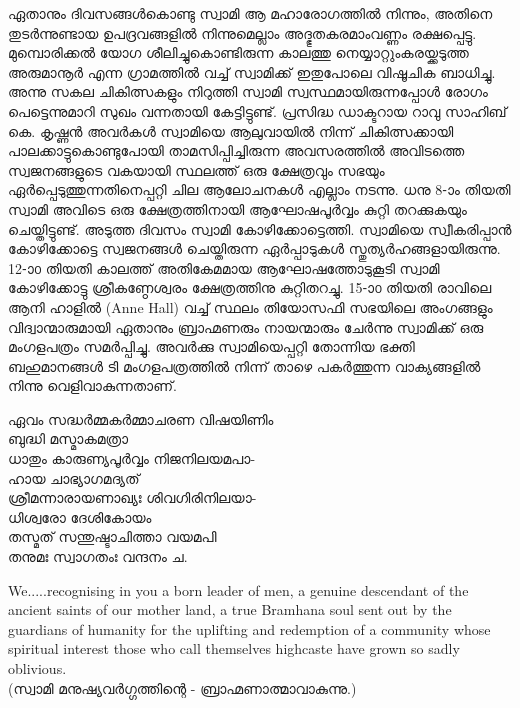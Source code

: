 \documentclass[12pt,openany]{book}
\newenvironment{myverse}
{\begin{quoting}[leftmargin=3em, rightmargin=3em, vskip=2ex, indentfirst=false, font=small]}
	{\end{quoting}}
\begin{document}
	ഏതാനും ദിവസങ്ങൾകൊണ്ടു സ്വാമി ആ മഹാരോഗത്തിൽ നിന്നും, അതിനെ തുടർന്നുണ്ടായ ഉപദ്രവങ്ങളിൽ നിന്നുമെല്ലാം അദ്ഭുതകരമാംവണ്ണം രക്ഷപ്പെട്ടു. മുമ്പൊരിക്കൽ യോഗ ശീലിച്ചുകൊണ്ടിരുന്ന കാലത്തു നെയ്യാറ്റുംകരയ്ക്കടുത്ത അരുമാനൂർ എന്ന ഗ്രാമത്തിൽ വച്ച് സ്വാമിക്ക് ഇതുപോലെ വിഷൂചിക ബാധിച്ചു. അന്നു സകല ചികിത്സകളും നിറുത്തി സ്വാമി സ്വസ്ഥമായിരുന്നപ്പോൾ രോഗം പെട്ടെന്നുമാറി സുഖം വന്നതായി കേട്ടിട്ടുണ്ട്. പ്രസിദ്ധ ഡാക്ടറായ റാവു സാഹിബ് കെ. കൃഷ്ണൻ അവർകൾ സ്വാമിയെ ആലുവായിൽ നിന്ന് ചികിത്സക്കായി പാലക്കാട്ടുകൊണ്ടുപോയി താമസിപ്പിച്ചിരുന്ന അവസരത്തിൽ അവിടത്തെ സ്വജനങ്ങളുടെ വകയായി സ്ഥലത്ത് ഒരു ക്ഷേത്രവും സഭയും ഏർപ്പെടുത്തുന്നതിനെപ്പറ്റി ചില ആലോചനകൾ എല്ലാം നടന്നു. ധനു 8-ാം തിയതി സ്വാമി അവിടെ ഒരു ക്ഷേത്രത്തിനായി ആഘോഷപൂർവ്വം കുറ്റി തറക്കുകയും ചെയ്തിട്ടുണ്ട്. അടുത്ത ദിവസം സ്വാമി കോഴിക്കോട്ടെത്തി. സ്വാമിയെ സ്വീകരിപ്പാൻ കോഴിക്കോട്ടെ സ്വജനങ്ങൾ ചെയ്തിരുന്ന ഏർപ്പാടുകൾ സ്തുത്യർഹങ്ങളായിരുന്നു. 12-ാ൦ തിയതി കാലത്ത് അതികേമമായ ആഘോഷത്തോടുകൂടി സ്വാമി കോഴിക്കോട്ടു ശ്രീകണ്ഠേശ്വരം ക്ഷേത്രത്തിനു കുറ്റിതറച്ചു. 15-ാ൦ തിയതി രാവിലെ ആനി ഹാളിൽ (Anne Hall) വച്ച് സ്ഥലം തിയോസഫി സഭയിലെ അംഗങ്ങളും വിദ്വാന്മാരുമായി ഏതാനും ബ്രാഹ്മണരും നായന്മാരും ചേർന്നു സ്വാമിക്ക് ഒരു മംഗളപത്രം സമർപ്പിച്ചു. അവർക്കു സ്വാമിയെപ്പറ്റി തോന്നിയ ഭക്തി ബഹുമാനങ്ങൾ ടി മംഗളപത്രത്തിൽ നിന്ന് താഴെ പകർത്തുന്ന വാക്യങ്ങളിൽ നിന്നു വെളിവാകുന്നതാണ്.
	
	\begin{myverse}
		ഏവം സദ്ധർമ്മകർമ്മാചരണ വിഷയിണിം\\
		\hspace*{2cm}ബുദ്ധി മസ്മാകമത്രാ\\
		ധാതും കാരുണ്യപൂർവ്വം നിജനിലയമപാ-\\
		\hspace*{2cm}ഹായ ചാഭ്യാഗമദ്യത്\\
		ശ്രീമന്നാരായണാഖ്യഃ ശിവഗിരിനിലയാ-\\
		\hspace*{2cm}ധിശ്വരോ ദേശികോയം\\
		തസ്മത് സന്തുഷ്ടാചിത്താ വയമപി\\
		\hspace*{2cm}തനുമഃ സ്വാഗതംഃ വന്ദനം ച.
	\end{myverse}
	
	We.....recognising in you a born leader of men, a genuine descendant of the ancient saints of our mother land, a true Bramhana soul sent out by the guardians of humanity for the uplifting and redemption of a community whose spiritual interest those who call themselves highcaste have grown so sadly oblivious.\\
	(സ്വാമി മനുഷ്യവർഗ്ഗത്തിന്റെ - ബ്രാഹ്മണാത്മാവാകുന്നു.)
	
\end{document}
